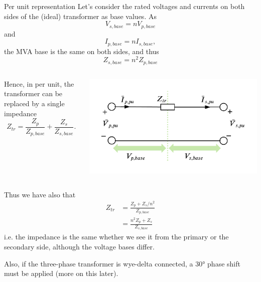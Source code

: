 \begin{frame}[allowframebreaks]{Per unit representation}
Let's consider the rated voltages and currents on both sides of the (ideal) transformer as base values. As
$$V_{s, base} = n V_{p, base} $$ and $$ I_{p, base} = n I_{s, base},$$
the \alert{MVA base is the same on both sides}, and thus
$$Z_{s, base} = n^2 Z_{p, base}$$


\begin{columns}
    \begin{column}{0.55\textwidth}
        Hence, \alert{in per unit, the transformer can be replaced by a single impedance}
        $$Z_{tr} = \frac{Z_{p}}{Z_{p, base}}+\frac{Z_{s}}{Z_{s, base}}.$$
    \end{column}
    \begin{column}{0.45\textwidth}
        \includegraphics[width=\textwidth]{images/tfo-pu.png}
    \end{column}
\end{columns}

Thus we have also that 
\begin{align*}
    Z_{tr} &= \frac{Z_{p}+ Z_s/n^2}{Z_{p, base}} \\
     &= \frac{n^2 Z_{p} + Z_s}{Z_{s, base}}
\end{align*}
i.e. \alert{the impedance is the same whether we see it from the primary or the secondary side, although the voltage bases differ}.

Also, if the three-phase transformer is \alert{wye-delta} connected, a \alert{30° phase shift} must be applied (more on this later).
\end{frame}


